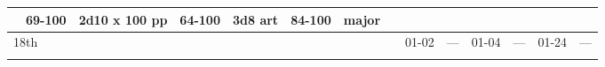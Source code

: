 \begin{longtable}{llllllllllllll}
{\begin{minipage}[t]{1.150in}
\end{minipage}} & \multicolumn{1}{|p{0.393in}|}{\begin{minipage}[t]{0.393in}\raggedright
69-100\end{minipage}} & \multicolumn{1}{p{0.469in}|}{\begin{minipage}[t]{0.469in}\raggedright
2d10 x 100 pp\end{minipage}} & \multicolumn{1}{p{0.923in}|}{\begin{minipage}[t]{0.923in}\raggedright
64-100\end{minipage}} & \multicolumn{1}{p{0.469in}|}{\begin{minipage}[t]{0.469in}\raggedright
3d8 art\end{minipage}} & \multicolumn{1}{p{0.626in}|}{\begin{minipage}[t]{0.626in}\raggedright
84-100\end{minipage}} & \multicolumn{1}{p{0.469in}|}{\begin{minipage}[t]{0.469in}\centering
1 major\end{minipage}}\\
\hline
\multicolumn{8}{p{1.150in}|}{\begin{minipage}[t]{1.150in}\centering
18th\end{minipage}} & \multicolumn{1}{|p{0.393in}|}{\begin{minipage}[t]{0.393in}\raggedright
01-02\end{minipage}} & \multicolumn{1}{p{0.469in}|}{\begin{minipage}[t]{0.469in}\raggedright
---\end{minipage}} & \multicolumn{1}{p{0.923in}|}{\begin{minipage}[t]{0.923in}\raggedright
01-04\end{minipage}} & \multicolumn{1}{p{0.469in}|}{\begin{minipage}[t]{0.469in}\raggedright
---\end{minipage}} & \multicolumn{1}{p{0.626in}|}{\begin{minipage}[t]{0.626in}\raggedright
01-24\end{minipage}} & \multicolumn{1}{p{0.469in}|}{\begin{minipage}[t]{0.469in}\centering
---\end{minipage}}\\
\hline
\multicolumn{8}{p{1.150in}|}{\begin{minipage}[t]{1.150in}\centering
\end{minipage}} & \multicolumn{1}{|p{0.393in}|}{\begin{minipage}[t]{0.393in}\raggedright

\end{minipage}}
\end{longtable}
